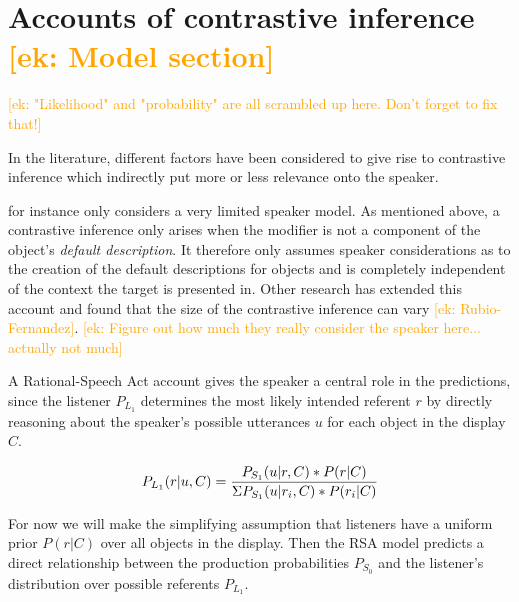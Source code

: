 \documentclass[10pt,letterpaper]{article}
\newcommand{\ek}[1]{\textcolor{Orange}{[ek: #1]}}
\begin{document}
\section{Accounts of contrastive inference \ek{Model section}}

\ek{"Likelihood" and "probability" are all scrambled up here. Don't forget to fix that!}

In the literature, different factors have been considered to give rise to contrastive inference which indirectly put more or less relevance onto the speaker. 

 for instance only considers a very limited speaker model. As mentioned above, a contrastive inference only arises when the modifier is not a component of the object's \textit{default description}. It therefore only assumes speaker considerations as to the creation of the default descriptions for objects and is completely independent of the context the target is presented in. 
Other research has extended this account and found that the size of the contrastive inference can vary \cite{Aparicio:2018}\ek{Rubio-Fernandez}. \ek{Figure out how much they really consider the speaker here... actually not much}


A Rational-Speech Act account gives the speaker a central role in the predictions, since the listener $P_{L_1}$ determines the most likely intended referent $r$ by directly reasoning about the speaker's possible utterances $u$ for each object in the display $C$. 

\begin{equation}
	P_{L_1}(r|u,C) = \frac{P_{S_1}(u|r,C) * P(r|C)}{\Sigma \space P_{S_1}(u|r_{i},C) * P(r_{i}|C)}
\label{eq-prior}
\end{equation}

For now we will make the simplifying assumption that listeners have a uniform prior $P(r|C)$ over all objects in the display. Then the RSA model predicts a direct relationship between the production probabilities $P_{S_0}$ and the listener's distribution over possible referents $P_{L_1}$. 
\end{document}
